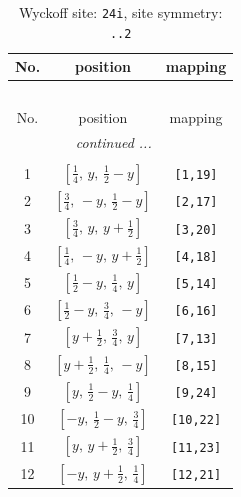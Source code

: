 \documentclass[fleqn,8pt]{jsarticle}
\begin{document}
\begin{longtable}{ccc}
\caption{Wyckoff site: {\tt 24i}, site symmetry: {\tt ..2}}
 \\
 \hline \hline
No. & position & mapping \\ \hline \endfirsthead

\multicolumn{2}{l}{\tablename\ \thetable{}} \\
 \hline \hline
No. & position & mapping \\ \hline \endhead

 \hline \hline
\multicolumn{2}{r}{\footnotesize\it continued ...} \\ \endfoot

 \hline \hline
\multicolumn{2}{r}{} \\ \endlastfoot

1 & $\left[ \frac{1}{4},\, y,\, \frac{1}{2} - y \right]$ & {\tt [1,19]} \\ \hline
2 & $\left[ \frac{3}{4},\, - y,\, \frac{1}{2} - y \right]$ & {\tt [2,17]} \\ \hline
3 & $\left[ \frac{3}{4},\, y,\, y + \frac{1}{2} \right]$ & {\tt [3,20]} \\ \hline
4 & $\left[ \frac{1}{4},\, - y,\, y + \frac{1}{2} \right]$ & {\tt [4,18]} \\ \hline
5 & $\left[ \frac{1}{2} - y,\, \frac{1}{4},\, y \right]$ & {\tt [5,14]} \\ \hline
6 & $\left[ \frac{1}{2} - y,\, \frac{3}{4},\, - y \right]$ & {\tt [6,16]} \\ \hline
7 & $\left[ y + \frac{1}{2},\, \frac{3}{4},\, y \right]$ & {\tt [7,13]} \\ \hline
8 & $\left[ y + \frac{1}{2},\, \frac{1}{4},\, - y \right]$ & {\tt [8,15]} \\ \hline
9 & $\left[ y,\, \frac{1}{2} - y,\, \frac{1}{4} \right]$ & {\tt [9,24]} \\ \hline
10 & $\left[ - y,\, \frac{1}{2} - y,\, \frac{3}{4} \right]$ & {\tt [10,22]} \\ \hline
11 & $\left[ y,\, y + \frac{1}{2},\, \frac{3}{4} \right]$ & {\tt [11,23]} \\ \hline
12 & $\left[ - y,\, y + \frac{1}{2},\, \frac{1}{4} \right]$ & {\tt [12,21]} \\
\end{longtable}
\renewcommand{\arraystretch}{1.2}
\end{document}
